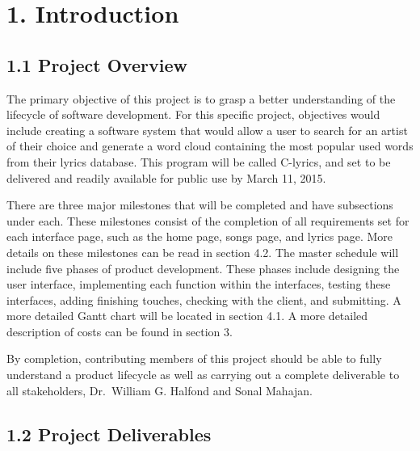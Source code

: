 \documentclass[]{article}
\author{}
\date{}
\begin{document}
\section{1. Introduction}\label{introduction}

\subsection{1.1 Project Overview}\label{project-overview}

The primary objective of this project is to grasp a better understanding
of the lifecycle of software development. For this specific project,
objectives would include creating a software system that would allow a
user to search for an artist of their choice and generate a word cloud
containing the most popular used words from their lyrics database. This
program will be called C-lyrics, and set to be delivered and readily
available for public use by March 11, 2015.

There are three major milestones that will be completed and have
subsections under each. These milestones consist of the completion of
all requirements set for each interface page, such as the home page,
songs page, and lyrics page. More details on these milestones can be
read in section 4.2. The master schedule will include five phases of
product development. These phases include designing the user interface,
implementing each function within the interfaces, testing these
interfaces, adding finishing touches, checking with the client, and
submitting. A more detailed Gantt chart will be located in section 4.1.
A more detailed description of costs can be found in section 3.

By completion, contributing members of this project should be able to
fully understand a product lifecycle as well as carrying out a complete
deliverable to all stakeholders, Dr.~William G. Halfond and Sonal
Mahajan.

\subsection{1.2 Project Deliverables}\label{project-deliverables}
\end{document}
